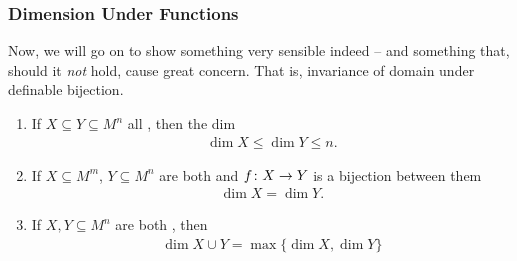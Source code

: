 \subsubsection{Dimension Under Functions}

Now, we will go on to show something very sensible indeed -- and something that, should it \emph{not} hold, cause great concern. That is, invariance of domain under definable bijection.

\begin{proposition}
  \begin{enumerate}
    \item \label{prop:defbij_1} If $X \subseteq Y \subseteq M^n$ all , then the dim
      \begin{align*}
        \dim{X} \leq \dim{Y} \leq n.
      \end{align*}
    \item \label{prop:defbij_2} If $X \subseteq M^m$, $Y \subseteq M^n$ are both  and $f \colon X \to Y$ is a  bijection between them
      \begin{align*}
        \dim{X} = \dim{Y}.
      \end{align*}
    \item \label{prop:defbij_3} If $X, Y \subseteq M^n$ are both , then
      \begin{align*}
        \dim{X \cup Y} = \max{\{ \dim{X}, \dim{Y} \}}
      \end{align*}
  \end{enumerate}  
\end{proposition}

